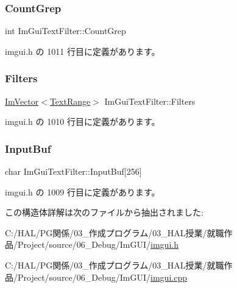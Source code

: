 \subsubsection{\texorpdfstring{Count\+Grep}{CountGrep}}
{\footnotesize\ttfamily int Im\+Gui\+Text\+Filter\+::\+Count\+Grep}



 imgui.\+h の 1011 行目に定義があります。

\mbox{\label{struct_im_gui_text_filter_a5a930a339a9384e6bfadfa56a7c111fd}} 
\subsubsection{\texorpdfstring{Filters}{Filters}}
{\footnotesize\ttfamily \mbox{\hyperlink{class_im_vector}{Im\+Vector}}$<$\mbox{\hyperlink{struct_im_gui_text_filter_1_1_text_range}{Text\+Range}}$>$ Im\+Gui\+Text\+Filter\+::\+Filters}



 imgui.\+h の 1010 行目に定義があります。

\mbox{\label{struct_im_gui_text_filter_ad070acb1038199dd4e8f5d010c5cb5ba}} 
\subsubsection{\texorpdfstring{Input\+Buf}{InputBuf}}
{\footnotesize\ttfamily char Im\+Gui\+Text\+Filter\+::\+Input\+Buf\mbox{[}256\mbox{]}}



 imgui.\+h の 1009 行目に定義があります。



この構造体詳解は次のファイルから抽出されました\+:\begin{DoxyCompactItemize}
\item 
C\+:/\+H\+A\+L/\+P\+G関係/03\+\_\+作成プログラム/03\+\_\+\+H\+A\+L授業/就職作品/\+Project/source/06\+\_\+\+Debug/\+Im\+G\+U\+I/\mbox{\hyperlink{imgui_8h}{imgui.\+h}}\item 
C\+:/\+H\+A\+L/\+P\+G関係/03\+\_\+作成プログラム/03\+\_\+\+H\+A\+L授業/就職作品/\+Project/source/06\+\_\+\+Debug/\+Im\+G\+U\+I/\mbox{\hyperlink{imgui_8cpp}{imgui.\+cpp}}\end{DoxyCompactItemize}
